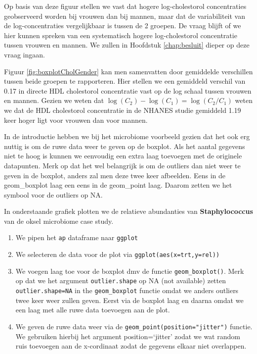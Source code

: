 \documentclass[
  12pt,dutch,coursenotes]{book}
\providecommand{\tightlist}{%
  \setlength{\itemsep}{0pt}\setlength{\parskip}{0pt}}
\theoremstyle{definition}
\theoremstyle{definition}
\theoremstyle{definition}
\theoremstyle{remark}
\begin{document}
Op basis van deze figuur
stellen we vast dat hogere log-cholestorol concentraties
geobserveerd worden bij vrouwen dan bij mannen, maar dat de variabiliteit
van de log-concentraties vergelijkbaar is tussen de 2 groepen. De vraag blijft of we hier kunnen spreken van een systematisch hogere
log-cholestorol concentratie tussen vrouwen en mannen. We zullen in Hoofdstuk \ref{chap:besluit} dieper op deze vraag ingaan.

Figuur \ref{fig:boxplotCholGender} kan men samenvatten door gemiddelde verschillen tussen beide groepen te rapporteren. Hier stellen we een gemiddeld verschil van 0.17 in directe HDL cholestorol concentratie vast op de log schaal tussen vrouwen en mannen.
Gezien we weten dat \(\log(C_2)-\log(C_1)=\log(C_2/C_1)\) weten we dat de HDL cholestorol concentratie in de NHANES studie gemiddeld 1.19 keer hoger ligt voor vrouwen dan voor mannen.

In de introductie hebben we bij het microbiome voorbeeld gezien dat het ook erg nuttig is om de ruwe data weer te geven op de boxplot. Als het aantal gegevens niet te hoog is kunnen we eenvoudig een extra laag toevoegen met de originele datapunten. Merk op dat het wel belangrijk is om de outliers dan niet weer te geven in de boxplot, anders zal men deze twee keer afbeelden. Eens in de geom\_boxplot laag een eens in de geom\_point laag. Daarom zetten we het symbool voor de outliers op NA.

In onderstaande grafiek plotten we de relatieve abundanties van \textbf{Staphylococcus} van de oksel microbiome case study.

\begin{enumerate}
\def\labelenumi{\arabic{enumi}.}
\tightlist
\item
  We pipen het \texttt{ap} dataframe naar \texttt{ggplot}
\item
  We selecteren de data voor de plot via \texttt{ggplot(aes(x=trt,y=rel))}
\item
  We voegen laag toe voor de boxplot dmv de functie \texttt{geom\_boxplot()}. Merk op dat we het argument \texttt{outlier.shape} op NA (not available) zetten \texttt{outlier.shape=NA} in the \texttt{geom\_boxplot} functie omdat we anders outliers twee keer weer zullen geven. Eerst via de boxplot laag en daarna omdat we een laag met alle ruwe data toevoegen aan de plot.
\item
  We geven de ruwe data weer via de \texttt{geom\_point(position="jitter")} functie. We gebruiken hierbij het argument position=`jitter' zodat we wat random ruis toevoegen aan de x-cordinaat zodat de gegevens elkaar niet overlappen.
\end{enumerate}
\end{document}
